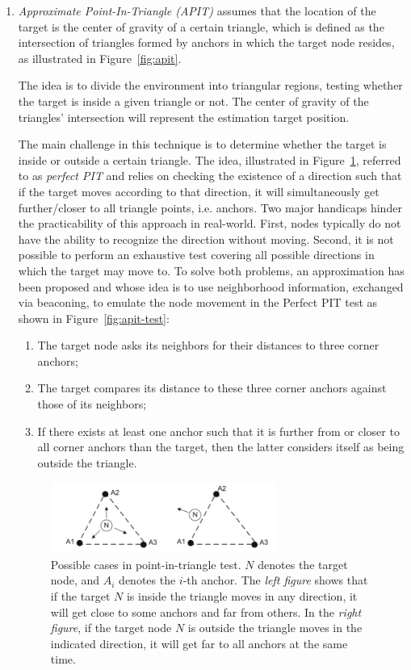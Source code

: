 \documentclass[a4paper,12pt]{article}
\begin{document}
\begin{enumerate}[label=(\alph*)]
\begin{enumerate}[label=(\roman*)]
    \item \textit{Approximate Point-In-Triangle (APIT)} assumes that the location of the target is the center of gravity of a certain triangle, which is defined as the intersection of triangles formed by anchors in which the target node resides, as illustrated in Figure~\ref{fig:apit}.

    The idea is to divide the environment into triangular regions, testing whether the target is inside a given triangle or not. The center of gravity of the triangles' intersection will represent the estimation target position.

    The main challenge in this technique is to determine whether the target is inside or outside a certain triangle. The idea, illustrated in Figure~\ref{fig:pit-test}, referred to as \textit{perfect PIT} and relies on checking the existence of a direction such that if the target moves according to that direction, it will simultaneously get further/closer to all triangle points, i.e. anchors.
    Two major handicaps hinder the practicability of this approach in real-world. First, nodes typically do not have the ability to recognize the direction without moving. Second, it is not possible to perform an exhaustive test covering all possible directions in which the target may move to. To solve both problems, an approximation has been proposed and whose idea is to use neighborhood information, exchanged via beaconing, to emulate the node movement in the Perfect PIT test as shown in Figure~\ref{fig:apit-test}:
    \begin{enumerate}[label=\arabic*.]
      \item The target node asks its neighbors for their distances to three corner anchors;
      \item The target compares its distance to these three corner anchors against those of its neighbors;
      \item If there exists at least one anchor such that it is further from or closer to all corner anchors than the target, then the latter considers itself as being outside the triangle.
    \end{enumerate}

    \begin{figure}[H]
      \centering
      \includegraphics[width=0.7\textwidth]{img/pit-test}
      \caption{\label{fig:pit-test}Possible cases in point-in-triangle test. $N$ denotes the target node, and $A_i$ denotes the $i$-th anchor. The \textit{left figure} shows that if the target $N$ is inside the triangle moves in any direction, it will get close to some anchors and far from others. In the \textit{right figure}, if the target node $N$ is outside the triangle moves in the indicated direction, it will get far to all anchors at the same time.}
    \end{figure}


\end{enumerate}
\end{enumerate}
\end{document}
